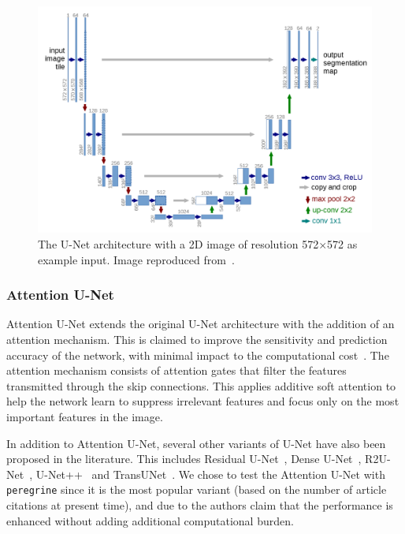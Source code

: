 \begin{figure}[tb]
    \centering
    \includegraphics[width=1\linewidth]{media/images/UNet_arch.png}
    \caption{The U-Net architecture with a 2D image of resolution 572$\times$572 as example input. Image reproduced from~\cite{Ronneberger_Fischer_Brox_2015}.}
    \label{fig:unet_arch}
    \myvspacecommand
\end{figure}

\subsubsection{Attention U-Net}

Attention U-Net extends the original U-Net architecture with the addition of an attention mechanism. This is claimed to improve the sensitivity and prediction accuracy of the network, with minimal impact to the computational cost~\cite{Oktay_2018_AUNet}. The attention mechanism consists of attention gates that filter the features transmitted through the skip connections. This applies additive soft attention to help the network learn to suppress irrelevant features and focus only on the most important features in the image.

In addition to Attention U-Net, several other variants of U-Net have also been proposed in the literature. This includes Residual U-Net~\cite{Zhang_resunet_2018}, Dense U-Net~\cite{Wang_dense_unet_2019}, R2U-Net~\cite{Alom_r2unet_2018}, U-Net++~\cite{Zhou_2018_unet++} and TransUNet~\cite{Chen_transunet_2021}. We chose to test the Attention U-Net with \texttt{peregrine} since it is the most popular variant (based on the number of article citations at present time), and due to the authors claim that the performance is enhanced without adding additional computational burden.

